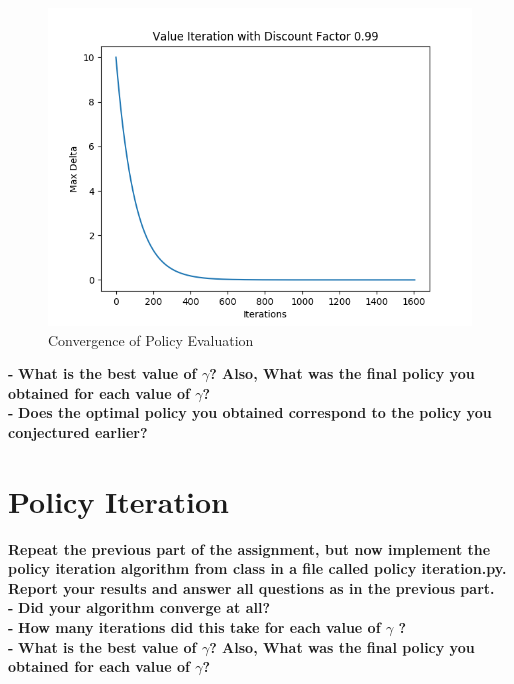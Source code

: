 \documentclass[11pt]{article}
\begin{document}
\begin{figure}[h]
\includegraphics[scale=0.5]{Value_99}
\centering
\caption{Convergence of Policy Evaluation}
\end{figure}

\noindent
\textbf{-}
\noindent
\textbf{What is the best value of $\gamma$? Also, What was the final policy you
obtained for each value of $\gamma$?}
\\

\noindent
\textbf{-}
\noindent
\textbf{Does the optimal policy you obtained correspond to the policy you
conjectured earlier?}
\\


\newpage
\section{Policy Iteration}
\textbf{Repeat the previous part of the assignment, but now implement the policy
iteration algorithm from class in a file called policy iteration.py. Report your
results and answer all questions as in the previous part.}
\\

\noindent
\textbf{-}
\noindent
\textbf{Did your algorithm converge at all?}
\\

\noindent
\textbf{-}
\noindent
\textbf{How many iterations did this take for each value of $\gamma$ ?}
\\

\noindent
\textbf{-}
\noindent
\textbf{What is the best value of $\gamma$? Also, What was the final policy you
obtained for each value of $\gamma$?}
\\
\end{document}
